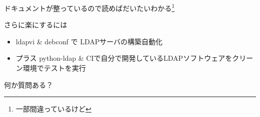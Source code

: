 \begin{frame}

{\Huge ドキュメントが整っているので読めばだいたいわかる\footnote{一部間違っているけど}}

\end{frame}

\begin{frame}{さらに楽にするには}
\begin{itemize}
\item ldapvi \& debconf で LDAPサーバの構築自動化
\item プラス python-ldap \& CIで自分で開発しているLDAPソフトウェアをクリーン環境でテストを実行
\end{itemize}
\end{frame}

\begin{frame}

{\Huge 何か質問ある？}

\end{frame}


